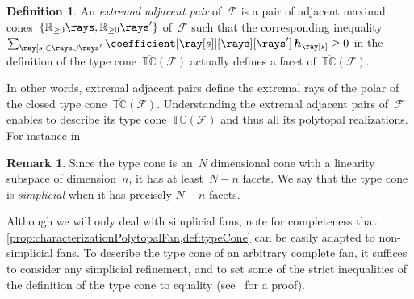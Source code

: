 \documentclass{amsart}
\theoremstyle{definition}
\newtheorem{definition}[theorem]{Definition}
\newtheorem{remark}[theorem]{Remark}
\newcommand{\R}{\mathbb{R}} %
\renewcommand{\b}[1]{{\boldsymbol{#1}}} %
\newcommand{\darkblue}{\color{darkblue}} %
\newcommand{\defn}[1]{\textsl{\darkblue #1}} %
\newcommand{\Fan}{\mathcal{F}} %
\newcommand{\typeCone}{\mathbb{TC}} %
\newcommand{\ctypeCone}{\overline{\mathbb{TC}}} %
\begin{document}
\begin{definition}
An \defn{extremal adjacent pair} of~$\Fan$ is a pair of adjacent maximal cones~$\{\R_{\ge0}\rays, \R_{\ge0}\rays'\}$ of~$\Fan$ such that the corresponding inequality $\sum_{\ray[s] \in \rays \cup \rays'} \coefficient[{\ray[s]}][\rays][\rays'] \, \b{h}_{\ray[s]} \geq 0$ in the definition of the type cone~$\ctypeCone(\Fan)$ actually defines a facet of~$\ctypeCone(\Fan)$.
\end{definition}

In other words, extremal adjacent pairs define the extremal rays of the polar of the closed type cone~$\ctypeCone(\Fan)$.
Understanding the extremal adjacent pairs of~$\Fan$ enables to describe its type cone~$\typeCone(\Fan)$ and thus all its polytopal realizations.
For instance in 

\begin{remark}
\label{rem:dimTypeCone}
Since the type cone is an~$N$ dimensional cone with a linearity subspace of dimension~$n$, it has at least~$N-n$ facets.
We say that the type cone is \defn{simplicial} when it has precisely $N-n$ facets.
\end{remark}

Although we will only deal with simplicial fans, note for completeness that \cref{prop:characterizationPolytopalFan,def:typeCone} can be easily adapted to non-simplicial fans. To describe the type cone of an arbitrary complete fan, it suffices to consider any simplicial refinement, and to set some of the strict inequalities of the definition of the type cone to equality (see~\cite[Prop.~3]{PilaudSantos-quotientopes} for a proof).
\end{document}
